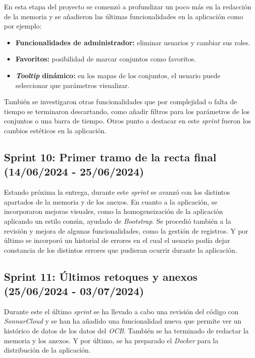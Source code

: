 En esta etapa del proyecto se comenzó a profundizar un poco más en la redacción de la memoria y se añadieron las últimas funcionalidades en la aplicación como por ejemplo:
\begin{itemize}
    \item \textbf{Funcionalidades de administrador:} eliminar usuarios y cambiar sus roles.
    \item \textbf{Favoritos:} posibilidad de marcar conjuntos como favoritos.
    \item \textbf{\textit{Tooltip} dinámico:} en los mapas de los conjuntos, el usuario puede seleccionar que parámetros visualizar.
\end{itemize}

También se investigaron otras funcionalidades que por complejidad o falta de tiempo se terminaron descartando, como añadir filtros para los parámetros de los conjuntos o una barra de tiempo.
Otros punto a destacar en este \textit{sprint} fueron los cambios estéticos en la aplicación.


\subsection{Sprint 10: Primer tramo de la recta final (14/06/2024 - 25/06/2024)}

Estando próxima la entrega, durante este \textit{sprint} se avanzó con los distintos apartados de la memoria y de los anexos.
En cuanto a la aplicación, se incorporaron mejoras visuales, como la homogeneización de la aplicación aplicando un estilo común, ayudado de \textit{Bootstrap}. Se procedió también a la revisión y mejora de algunas funcionalidades, como la gestión de registros. Y por último se incorporó un historial de errores en el cual el usuario podía dejar constancia de los distintos errores que pudieran ocurrir durante la aplicación.


\subsection{Sprint 11: Últimos retoques y anexos (25/06/2024 - 03/07/2024)}

Durante este el último \textit{sprint} se ha llevado a cabo una revisión del código con \textit{SonnarCloud} y se han ha añadido una funcionalidad nueva que permite ver un histórico de datos de los datos del \textit{OCB}.
También se ha terminado de redactar la memoria y los anexos. Y por último, se ha preparado el \textit{Docker} para la distribución de la aplicación.

